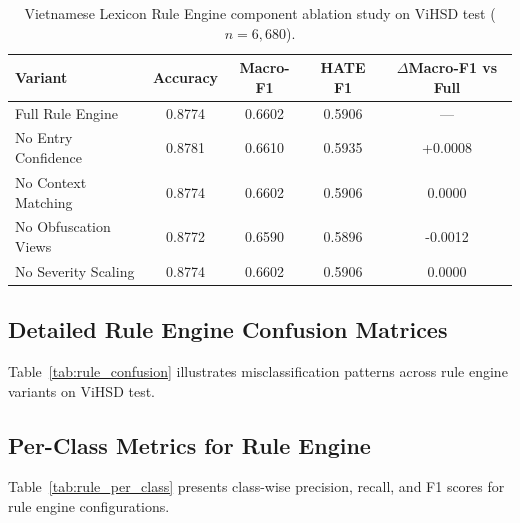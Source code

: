 \documentclass[runningheads]{llncs}
\begin{document}
\begin{table}[H]
\centering
\caption{Vietnamese Lexicon Rule Engine component ablation study on ViHSD test ($n=6{,}680$).}
\label{tab:rule_ablation_full}
\begin{tabular}{lcccc}
\toprule
Variant & Accuracy & Macro-F1 & HATE F1 & $\Delta$Macro-F1 vs Full \\
\midrule
Full Rule Engine & 0.8774 & 0.6602 & 0.5906 & --- \\
No Entry Confidence & 0.8781 & 0.6610 & 0.5935 & +0.0008 \\
No Context Matching & 0.8774 & 0.6602 & 0.5906 & 0.0000 \\
No Obfuscation Views & 0.8772 & 0.6590 & 0.5896 & -0.0012 \\
No Severity Scaling & 0.8774 & 0.6602 & 0.5906 & 0.0000 \\
\bottomrule
\end{tabular}
\end{table}

\subsection{Detailed Rule Engine Confusion Matrices}
Table~\ref{tab:rule_confusion} illustrates misclassification patterns across rule engine variants on ViHSD test.

\begin{table}[H]
\centering
\caption{Detailed confusion matrix breakdown for standalone Rule Engine variants on ViHSD test ($n=6{,}680$).}
\label{tab:rule_confusion}
\scriptsize
\setlength{\tabcolsep}{2pt}
\end{table}

\subsection{Per-Class Metrics for Rule Engine}
Table~\ref{tab:rule_per_class} presents class-wise precision, recall, and F1 scores for rule engine configurations.
\end{document}
